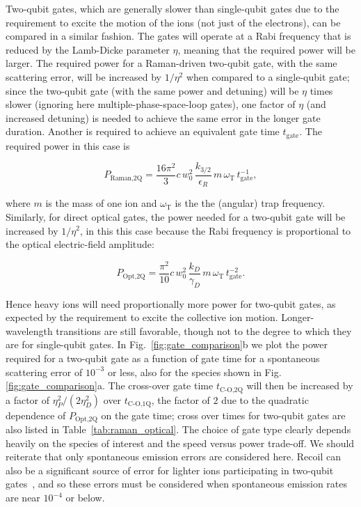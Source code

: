 \documentclass[%
reprint,
 amsmath,amssymb,
]{revtex4-1}
\begin{document}
Two-qubit gates, which are generally slower than single-qubit gates due to the requirement to excite the motion of the ions (not just of the electrons), can be compared in a similar fashion.  The gates will operate at a Rabi frequency that is reduced by the Lamb-Dicke parameter $\eta$, meaning that the required power will be larger.  The required power for a Raman-driven two-qubit gate, with the same scattering error, will be increased by $1/\eta^2$ when compared to a single-qubit gate; since the two-qubit gate (with the same power and detuning) will be $\eta$ times slower (ignoring here multiple-phase-space-loop gates), one factor of $\eta$ (and increased detuning) is needed to achieve the same error in the longer gate duration.  Another is required to achieve an equivalent gate time $t_{\textrm{gate}}$.  The required power in this case is

\begin{equation}
P_{\textrm{Raman,2Q}}=\frac{16\pi^{2}}{3} c\, w_{0}^{2}\, \frac{k_{3/2}}{\epsilon_R}\, m\, \omega_{\textrm{T}}\, t^{-1}_{\textrm{gate}},
\end{equation}

\noindent where $m$ is the mass of one ion and $\omega_{\textrm{T}}$ is the the (angular) trap frequency.  Similarly, for direct optical gates, the power needed for a two-qubit gate will be increased by $1/\eta^{2}$, in this this case because the Rabi frequency is proportional to the optical electric-field amplitude:

 \begin{equation}
P_{\textrm{Opt,2Q}}=\frac{\pi^{2}}{10} c\, w_{0}^{2}\, \frac{k_{D}}{\gamma_{D}}\, m\, \omega_{\textrm{T}}\, t^{-2}_{\textrm{gate}}.
\end{equation}

\noindent Hence heavy ions will need proportionally more power for two-qubit gates, as expected by the requirement to excite the collective ion motion.  Longer-wavelength transitions are still favorable, though not to the degree to which they are for single-qubit gates.  In Fig.~\ref{fig:gate_comparison}b we plot the power required for a two-qubit gate as a function of gate time for a spontaneous scattering error of $10^{-3}$ or less, also for the species shown in Fig. \ref{fig:gate_comparison}a.
The cross-over gate time $t_{\textrm{C-O,2Q}}$ will then be increased by a factor of $\eta_{P}^{2}/(2 \eta_{D}^2)$ over $t_{\textrm{C-O,1Q}}$, the factor of $2$ due to the quadratic dependence of $P_{\textrm{Opt,2Q}}$ on the gate time; cross over times for two-qubit gates are also listed in Table~\ref{tab:raman_optical}.  The choice of gate type clearly depends heavily on the species of interest and the speed versus power trade-off.  We should reiterate that only spontaneous emission errors are considered here.  Recoil can also be a significant source of error for lighter ions participating in two-qubit gates~\cite{PhysRevA.75.042329_2007}, and so these errors must be considered when spontaneous emission rates are near $10^{-4}$ or below.
\end{document}

